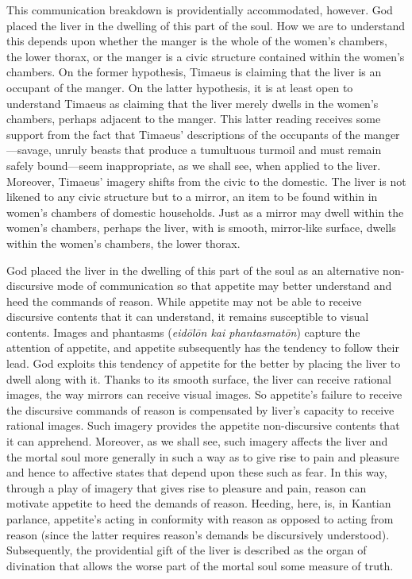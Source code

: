 This communication breakdown is providentially accommodated, however. God placed the liver in the dwelling of this part of the soul. How we are to understand this depends upon whether the manger is the whole of the women's chambers, the lower thorax, or the manger is a civic structure contained within the women's chambers. On the former hypothesis, Timaeus is claiming that the liver is an occupant of the manger. On the latter hypothesis, it is at least open to understand Timaeus as claiming that the liver merely dwells in the women's chambers, perhaps adjacent to the manger. This latter reading receives some support from the fact that Timaeus' descriptions of the occupants of the manger---savage, unruly beasts that produce a tumultuous turmoil and must remain safely bound---seem inappropriate, as we shall see, when applied to the liver. Moreover, Timaeus' imagery shifts from the civic to the domestic. The liver is not likened to any civic structure but to a mirror, an item to be found within in women's chambers of domestic households. Just as a mirror may dwell within the women's chambers, perhaps the liver, with is smooth, mirror-like surface, dwells within the women's chambers, the lower thorax.

God placed the liver in the dwelling of this part of the soul as an alternative non-discursive mode of communication so that appetite may better understand and heed the commands of reason. While appetite may not be able to receive discursive contents that it can understand, it remains susceptible to visual contents. Images and phantasms (\emph{eidōlōn kai phantasmatōn}) capture the attention of appetite, and appetite subsequently has the tendency to follow their lead. God exploits this tendency of appetite for the better by placing the liver to dwell along with it. Thanks to its smooth surface, the liver can receive rational images, the way mirrors can receive visual images. So appetite's failure to receive the discursive commands of reason is compensated by liver's capacity to receive rational images. Such imagery provides the appetite non-discursive contents that it can apprehend. Moreover, as we shall see, such imagery affects the liver and the mortal soul more generally in such a way as to give rise to pain and pleasure and hence to affective states that depend upon these such as fear. In this way, through a play of imagery that gives rise to pleasure and pain, reason can motivate appetite to heed the demands of reason. Heeding, here, is, in Kantian parlance, appetite's acting in conformity with reason as opposed to acting from reason (since the latter requires reason's demands be discursively understood). Subsequently, the providential gift of the liver is described as the organ of divination that allows the worse part of the mortal soul some measure of truth. 

